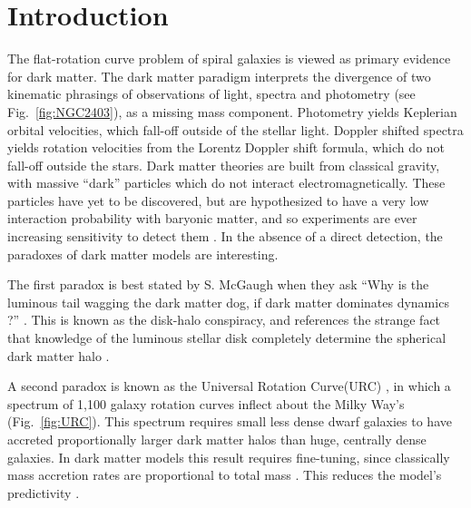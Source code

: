 \documentclass[reprint,%
 amsmath,amssymb,
 aps,
]{revtex4-1}
\begin{document}
\section{Introduction  \label{sec:uno}}



 The flat-rotation curve problem of spiral galaxies  is viewed as primary evidence for dark matter\cite{Rub,Bosma,1985ApJAlbada}. 
 The dark matter paradigm interprets the divergence of two kinematic phrasings of         observations of light, spectra and photometry (see Fig.~\ref{fig:NGC2403}),     as a missing mass component. 
 Photometry yields Keplerian orbital velocities, which fall-off outside of the stellar light. Doppler shifted spectra yields rotation velocities from the Lorentz Doppler shift formula, which do not fall-off outside the stars.  
 Dark matter theories are built from classical gravity,   with massive
   ``dark'' particles  which do not interact electromagnetically.   These particles have   yet to be    discovered, but are hypothesized to have a very low interaction probability with baryonic matter, and so  experiments are ever increasing   sensitivity to detect them \cite{Cebrian:2022brv}. In the absence of a direct detection, the paradoxes of dark matter models are interesting. 
   
   The first paradox is best stated by 
  S. McGaugh  when they ask   ``Why is the luminous tail wagging the dark matter dog,  if dark matter dominates dynamics ?'' \cite{1999McGaugh,McGaugh2016RAR}. This is known as the  disk-halo conspiracy, and references the strange fact that knowledge  of 
 the luminous stellar   disk  completely determine the spherical dark matter halo \cite{2004ApJ...609..652M}.  
 
 
 
 A second paradox  is known as  the Universal Rotation Curve(URC)  \cite{salucci,Persic,1978Rubin,10.1111/j.1365-2966.2007.11696.x}, in which  a spectrum of 1,100 galaxy rotation curves
 inflect  about  the Milky Way's    (Fig.~\ref{fig:URC}).  This spectrum requires   
  small less dense  dwarf galaxies to have accreted   proportionally larger dark matter halos than   huge, centrally dense    galaxies. 
   In dark  matter models this result requires fine-tuning, since
  classically mass accretion rates are proportional to total mass \cite{10.1093/mnras/stt2403}.  
  This reduces the model's    predictivity   \cite{MCGAUGH2021220}. 
  
\end{document}

